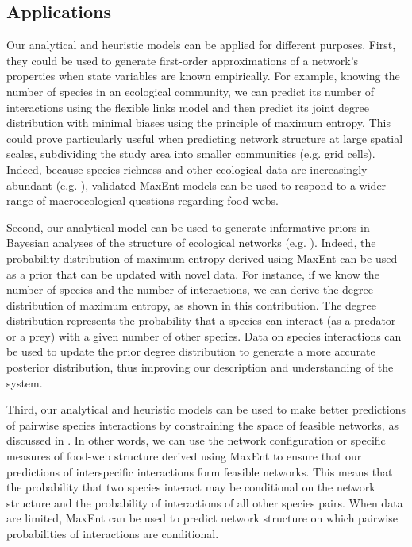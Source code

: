 \subsection{Applications}

Our analytical and heuristic models can be applied for different purposes.
First, they could be used to generate first-order approximations of a network's
properties when state variables are known empirically. For example, knowing the
number of species in an ecological community, we can predict its number of
interactions using the flexible links model and then predict its joint degree
distribution with minimal biases using the principle of maximum entropy. This
could prove particularly useful when predicting network structure at large
spatial scales, subdividing the study area into smaller communities (e.g. grid
cells). Indeed, because species richness and other ecological data are
increasingly abundant (e.g. \cite{Dickinson2010Citizen}), validated MaxEnt models
can be used to respond to a wider range of macroecological questions regarding
food webs. 

Second, our analytical model can be used to generate informative priors in
Bayesian analyses of the structure of ecological networks (e.g.
\cite{Cirtwill2019Quantitative}). Indeed, the probability distribution of maximum
entropy derived using MaxEnt can be used as a prior that can be updated with
novel data. For instance, if we know the number of species and the number of
interactions, we can derive the degree distribution of maximum entropy, as shown
in this contribution. The degree distribution represents the probability that a
species can interact (as a predator or a prey) with a given number of other
species. Data on species interactions can be used to update the prior degree
distribution to generate a more accurate posterior distribution, thus improving
our description and understanding of the system.

Third, our analytical and heuristic models can be used to make better
predictions of pairwise species interactions by constraining the space of
feasible networks, as discussed in \textcite{Strydom2021Roadmapa}. In other words, we
can use the network configuration or specific measures of food-web structure
derived using MaxEnt to ensure that our predictions of interspecific
interactions form feasible networks. This means that the probability that two
species interact may be conditional on the network structure and the probability
of interactions of all other species pairs. When data are limited, MaxEnt can be
used to predict network structure on which pairwise probabilities of
interactions are conditional.

